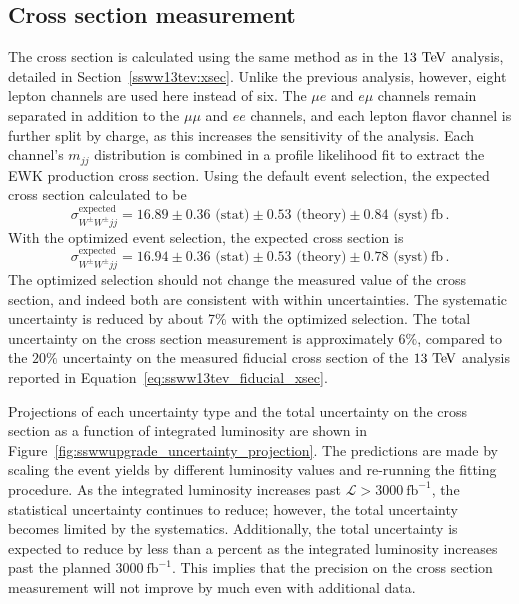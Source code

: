 \subsection{Cross section measurement}\label{sswwupgrade:results_xsec}

The cross section is calculated using the same method as in the $13\tev$ analysis, detailed in Section~\ref{ssww13tev:xsec}.
Unlike the previous analysis, however, eight lepton channels are used here instead of six.
The $\mu e$ and $e\mu$ channels remain separated in addition to the $\mu\mu$ and $ee$ channels, and each lepton flavor channel is further split by charge, as this increases the sensitivity of the analysis.
Each channel's $m_{jj}$ distribution is combined in a profile likelihood fit to extract the EWK \ssww production cross section.
Using the default event selection, the expected cross section calculated to be
\begin{equation}
  \sigma_{W^\pm W^\pm jj}^{\textrm{expected}} = 16.89 \pm 0.36 \textrm{\ (stat)} \pm 0.53 \textrm{\ (theory)} \pm 0.84 \textrm{\ (syst)}~\textrm{fb}\,.
  \label{eq:sswwupgrade_xsec_default}
\end{equation}
With the optimized event selection, the expected cross section is
\begin{equation}
    \sigma_{W^\pm W^\pm jj}^{\textrm{expected}} = 16.94 \pm 0.36 \textrm{\ (stat)} \pm 0.53 \textrm{\ (theory)} \pm 0.78 \textrm{\ (syst)}~\textrm{fb}\,.
  \label{eq:sswwupgrade_xsec_optimized}
\end{equation}
The optimized selection should not change the measured value of the cross section, and indeed both are consistent with within uncertainties.
The systematic uncertainty is reduced by about 7\% with the optimized selection.
The total uncertainty on the cross section measurement is approximately $6\%$, compared to the $20\%$ uncertainty on the measured fiducial cross section of the $13\tev$ analysis reported in Equation~\ref{eq:ssww13tev_fiducial_xsec}.

Projections of each uncertainty type and the total uncertainty on the cross section as a function of integrated luminosity are shown in Figure~\ref{fig:sswwupgrade_uncertainty_projection}.
The predictions are made by scaling the event yields by different luminosity values and re-running the fitting procedure.
As the integrated luminosity increases past $\mathcal{L} > 3000~\textrm{fb}^{-1}$, the statistical uncertainty continues to reduce; however, the total uncertainty becomes limited by the systematics.
Additionally, the total uncertainty is expected to reduce by less than a percent as the integrated luminosity increases past the planned $3000~\textrm{fb}^{-1}$.
This implies that the precision on the cross section measurement will not improve by much even with additional data.

